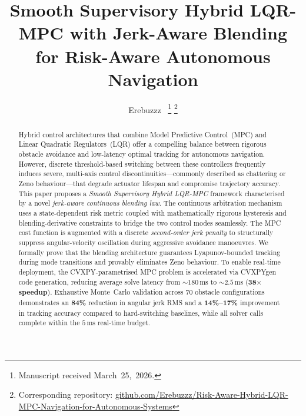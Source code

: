 \documentclass[journal]{IEEEtran}
\begin{document}
\title{Smooth Supervisory Hybrid LQR-MPC with Jerk-Aware Blending \\
for Risk-Aware Autonomous Navigation}

\author{Erebuzzz~\IEEEmembership{}
\thanks{Manuscript received March~25,~2026.}
\thanks{Corresponding repository: \href{https://github.com/Erebuzzz/Risk-Aware-Hybrid-LQR-MPC-Navigation-for-Autonomous-Systems}{github.com/Erebuzzz/Risk-Aware-Hybrid-LQR-MPC-Navigation-for-Autonomous-Systems}}
}

\maketitle

\begin{abstract}
Hybrid control architectures that combine Model Predictive Control~(MPC) and
Linear Quadratic Regulators~(LQR) offer a compelling balance between rigorous
obstacle avoidance and low-latency optimal tracking for autonomous navigation.
However, discrete threshold-based switching between these controllers frequently
induces severe, multi-axis control discontinuities---commonly described as
chattering or Zeno behaviour---that degrade actuator lifespan and compromise
trajectory accuracy.
This paper proposes a \emph{Smooth Supervisory Hybrid LQR-MPC} framework
characterised by a novel \emph{jerk-aware continuous blending law}.
The continuous arbitration mechanism uses a state-dependent risk metric coupled
with mathematically rigorous hysteresis and blending-derivative constraints to
bridge the two control modes seamlessly.
The MPC cost function is augmented with a discrete \emph{second-order jerk
penalty} to structurally suppress angular-velocity oscillation during aggressive
avoidance manoeuvres.
We formally prove that the blending architecture guarantees Lyapunov-bounded
tracking during mode transitions and provably eliminates Zeno behaviour.
To enable real-time deployment, the CVXPY-parametrised MPC problem is
accelerated via CVXPYgen code generation, reducing average solve latency from
\(\sim\!180\,\text{ms}\) to \(\sim\!2.5\,\text{ms}\) (\textbf{38\(\times\)
speedup}).
Exhaustive Monte~Carlo validation across 70 obstacle configurations demonstrates
an \textbf{84\%} reduction in angular jerk RMS and a \textbf{14\%--17\%}
improvement in tracking accuracy compared to hard-switching baselines, while
all solver calls complete within the \(5\,\text{ms}\) real-time budget.
\end{abstract}
\end{document}
